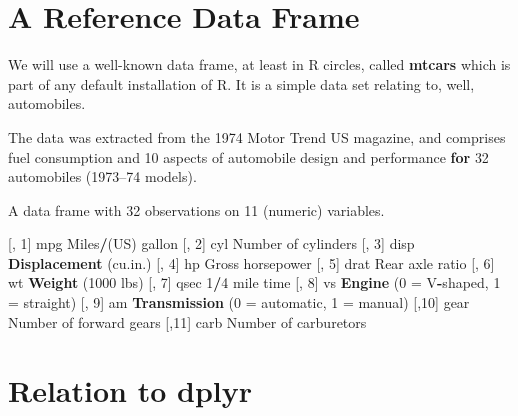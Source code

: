 \documentclass[]{book}
\newenvironment{Shaded}{\begin{snugshade}}{\end{snugshade}}
\newcommand{\KeywordTok}[1]{\textcolor[rgb]{0.13,0.29,0.53}{\textbf{#1}}}
\newcommand{\DecValTok}[1]{\textcolor[rgb]{0.00,0.00,0.81}{#1}}
\newcommand{\StringTok}[1]{\textcolor[rgb]{0.31,0.60,0.02}{#1}}
\newcommand{\ControlFlowTok}[1]{\textcolor[rgb]{0.13,0.29,0.53}{\textbf{#1}}}
\newcommand{\OperatorTok}[1]{\textcolor[rgb]{0.81,0.36,0.00}{\textbf{#1}}}
\newcommand{\NormalTok}[1]{#1}
\begin{document}
\section{A Reference Data Frame}\label{a-reference-data-frame}

We will use a well-known data frame, at least in R circles, called
\textbf{mtcars} which is part of any default installation of R. It is a
simple data set relating to, well, automobiles.

\begin{Shaded}
\begin{Highlighting}[]
\NormalTok{The data was extracted from the }\DecValTok{1974}\NormalTok{ Motor Trend US }
\NormalTok{magazine, and comprises fuel consumption and }\DecValTok{10}\NormalTok{ aspects }
\NormalTok{of automobile design and performance }\ControlFlowTok{for} \DecValTok{32}\NormalTok{ automobiles }
\NormalTok{(}\DecValTok{1973}\NormalTok{–}\DecValTok{74}\NormalTok{ models).}

\NormalTok{A data frame with }\DecValTok{32}\NormalTok{ observations on }\DecValTok{11}\NormalTok{ (numeric) }
\NormalTok{variables.}

\NormalTok{[, }\DecValTok{1}\NormalTok{]   mpg Miles}\OperatorTok{/}\NormalTok{(US) gallon}
\NormalTok{[, }\DecValTok{2}\NormalTok{]   cyl Number of cylinders}
\NormalTok{[, }\DecValTok{3}\NormalTok{]   disp    }\KeywordTok{Displacement}\NormalTok{ (cu.in.)}
\NormalTok{[, }\DecValTok{4}\NormalTok{]   hp  Gross horsepower}
\NormalTok{[, }\DecValTok{5}\NormalTok{]   drat    Rear axle ratio}
\NormalTok{[, }\DecValTok{6}\NormalTok{]   wt  }\KeywordTok{Weight}\NormalTok{ (}\DecValTok{1000}\NormalTok{ lbs)}
\NormalTok{[, }\DecValTok{7}\NormalTok{]   qsec    }\DecValTok{1}\OperatorTok{/}\DecValTok{4}\NormalTok{ mile time}
\NormalTok{[, }\DecValTok{8}\NormalTok{]   vs  }\KeywordTok{Engine}\NormalTok{ (}\DecValTok{0}\NormalTok{ =}\StringTok{ }\NormalTok{V}\OperatorTok{-}\NormalTok{shaped, }\DecValTok{1}\NormalTok{ =}\StringTok{ }\NormalTok{straight)}
\NormalTok{[, }\DecValTok{9}\NormalTok{]   am  }\KeywordTok{Transmission}\NormalTok{ (}\DecValTok{0}\NormalTok{ =}\StringTok{ }\NormalTok{automatic, }\DecValTok{1}\NormalTok{ =}\StringTok{ }\NormalTok{manual)}
\NormalTok{[,}\DecValTok{10}\NormalTok{]   gear    Number of forward gears}
\NormalTok{[,}\DecValTok{11}\NormalTok{]   carb    Number of carburetors}
\end{Highlighting}
\end{Shaded}

\section{Relation to dplyr}\label{relation-to-dplyr}
\end{document}
